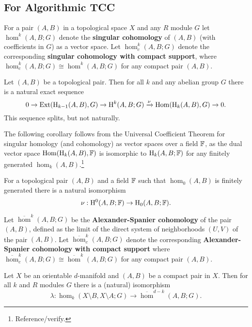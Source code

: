 \subsection{For Algorithmic TCC}

For a pair $(A, B)$ in a topological space $X$ and any $R$ module $G$ let $\hom^k(A, B; G)$ denote the \textbf{singular cohomology} of $(A,B)$ (with coefficients in $G$) as a vector space.
Let $\hom^k_c(A, B; G)$ denote the corresponding \textbf{singular cohomology with compact support}, where $\hom^k_c(A, B; G)\cong \hom^k(A, B; G)$ for any compact pair $(A,B)$.

\begin{theorem}\label{thm:univ_coef}
  Let $(A,B)$ be a topological pair.
  Then for all $k$ and any abelian group $G$ there is a natural exact sequence
  \[ 0\to\mathrm{Ext}(\mathrm{H}_{k-1}(A, B), G)\to \mathrm{H}^k(A, B; G)\xrightarrow{\nu} \mathrm{Hom}(\mathrm{H}_k(A, B), G)\to 0.\]
  This sequence splits, but not naturally.
\end{theorem}

The following corollary follows from the Universal Coefficient Theorem for singular homology (and cohomology) as vector spaces over a field $\mathbb{F}$, as the dual vector space $\mathrm{Hom}(\mathrm{H}_k(A, B), \mathbb{F})$ is isomorphic to $\mathrm{H}_k(A, B; \mathbb{F})$ for any finitely generated $\hom_k(A, B)$.\footnote{Reference/verify.}

\begin{corollary}\label{cor:univ_coef}
  For a topological pair $(A, B)$ and a field $\mathbb{F}$ such that $\hom_0(A, B)$ is finitely generated there is a natural isomorphism
  \[\nu : \mathrm{H}^0(A, B; \mathbb{F})\to \mathrm{H}_0(A, B; \mathbb{F}).\]
\end{corollary}

Let $\overline{\hom}^k(A, B; G)$ be the \textbf{Alexander-Spanier cohomology} of the pair $(A,B)$, defined as the limit of the direct system of neighborhoods $(U,V)$ of the pair $(A, B)$.
Let $\overline{\hom}^k_c(A, B; G)$ denote the corresponding \textbf{Alexander-Spanier cohomology with compact support} where $\overline{\hom}^k_c(A, B; G)\cong\overline{\hom}^k(A, B; G)$ for any compact pair $(A, B)$.

\begin{theorem}\label{thm:alexander}
  Let $X$ be an orientable $d$-manifold and $(A, B)$ be a compact pair in $X$.
  Then for all $k$ and $R$ modules $G$ there is a (natural) isomorphism
  \[\lambda : \hom_k(X\setminus B, X\setminus A; G)\to \overline{\hom}^{d-k}(A, B; G).\]
\end{theorem}

